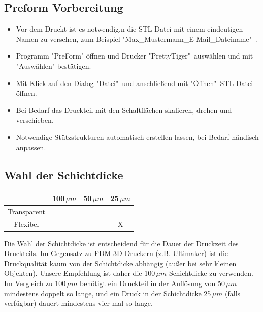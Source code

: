 \documentclass{\basedir/fablab-document}
\begin{document}
 \subsection{Preform Vorbereitung}
 
	\begin{itemize}
		\item Vor dem Druckt ist es notwendig,n die STL-Datei mit einem eindeutigen Namen zu versehen, zum Beispiel "Max\_Mustermann\_E-Mail\_Dateiname"\ .
		\item Programm "PreForm" öffnen und Drucker "PrettyTiger"\, auswählen und mit "Auswählen" bestätigen.
		\item Mit Klick auf den Dialog "Datei"\  und anschließend mit "Öffnen"\ STL-Datei öffnen.
		\item Bei Bedarf das Druckteil mit den Schaltflächen skalieren, drehen und verschieben.
		\item Notwendige Stützstrukturen automatisch erstellen lassen, bei Bedarf händisch anpassen.
	\end{itemize}

\subsection{Wahl der Schichtdicke}

\begin{table} [H]
	\centering
	\begin{tabular}{|c|c|c|c|}\hline
	  & 100\,$\mu m$ & 50\,$\mu m$ & 25\,$\mu m $\\ \hline
	Transparent & \checkmark &\checkmark &\checkmark \\ \hline
	Flexibel & \checkmark &\checkmark & X\\ \hline
	\end{tabular}
\end{table}

Die Wahl der Schichtdicke ist entscheidend für die Dauer der Druckzeit des Druckteils. Im Gegensatz zu FDM-3D-Druckern (z.B. Ultimaker) ist die Druckqualität kaum von der Schichtdicke abhängig (außer bei sehr kleinen Objekten). Unsere Empfehlung ist daher die 100\,$\mu m$ Schichtdicke zu verwenden. \\
Im Vergleich zu 100\,$\mu m$ benötigt ein Druckteil in der Auflösung von 50\,$\mu m$ mindestens doppelt so lange, und ein Druck in der Schichtdicke  25\,$\mu m$ (falls verfügbar) dauert mindestens vier mal so lange.
		 	
\end{document}

